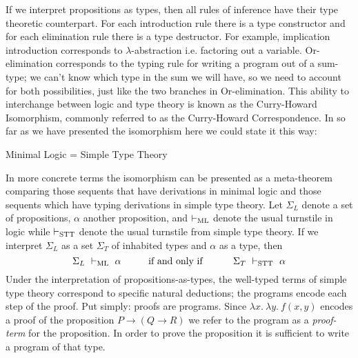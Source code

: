 \documentclass{book}
\begin{document}
    If we interpret propositions as types, then all rules of inference have their type theoretic counterpart. For each introduction rule there is a type constructor and for each elimination rule there is a type destructor. For example, implication introduction corresponds to $\lambda$-abstraction i.e. factoring out a variable. Or-elimination corresponds to the typing rule for writing a program out of a sum-type; we can't know which type in the sum we will have, so we need to account for both possibilities, just like the two branches in Or-elimination. This ability to interchange between logic and type theory is known as the Curry-Howard Isomorphism, commonly referred to as the Curry-Howard Correspondence. In so far as we have presented the isomorphism here we could state it this way:

    \begin{center}
        Minimal Logic = Simple Type Theory
    \end{center}

    In more concrete terms the isomorphism can be presented as a meta-theorem comparing those sequents that have derivations in minimal logic and those sequents which have typing derivations in simple type theory. Let $\Sigma_{L}$ denote a set of propositions, $\alpha$ another proposition, and $\vdash_{\textnormal{ML}}$ denote the usual turnstile in logic while $\vdash_{\textnormal{STT}}$ denote the usual turnstile from simple type theory. If we interpret $\Sigma_{L}$ as a set $\Sigma_{T}$ of inhabited types and $\alpha$ as a type, then 
    $$ \Sigma_{L} \ \vdash_{\textnormal{ML}} \ \alpha \hspace{1cm} \text{if and only if } \hspace{1cm} \Sigma_{T} \ \vdash_{\textnormal{STT}} \ \alpha$$
    Under the interpretation of propositions-as-types, the well-typed terms of simple type theory correspond to specific natural deductions; the programs encode each step of the proof. Put simply: proofs are programs. Since $\lambda x. \ \lambda y. \ f(x,y)$ encodes a proof of the proposition $P\to(Q\to R)$ we refer to the program as a \emph{proof-term} for the proposition. In order to prove the proposition it is sufficient to write a program of that type. 
    
\end{document}
